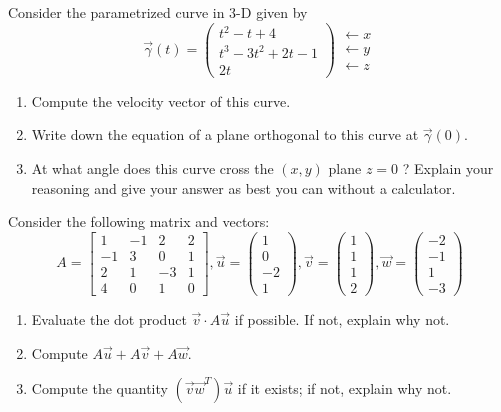 \documentclass[12pt]{amsart}
\begin{document}
\begin{problem}
Consider the parametrized curve in 3-D given by
$$
\vec{\gamma}(t)=\begin{pmatrix}
t^2-t+4 \\
t^3-3 t^2+2 t-1 \\
2 t
\end{pmatrix} \begin{gathered}
\leftarrow x \\
\leftarrow y \\
\leftarrow z
\end{gathered}
$$
\begin{enumerate}
    \item  Compute the velocity vector of this curve.
    \item Write down the equation of a plane orthogonal to this curve at $\vec{\gamma}(0)$.
    \item At what angle does this curve cross the $(x, y)$ plane $z=0$ ? Explain your reasoning and give your answer as best you can without a calculator.
\end{enumerate}
\end{problem}

\begin{problem}
Consider the following matrix and vectors:
$$
A=\left[\begin{array}{cccc}
1 & -1 & 2 & 2 \\
-1 & 3 & 0 & 1 \\
2 & 1 & -3 & 1 \\
4 & 0 & 1 & 0
\end{array}\right], 
\vec{u}=\left(\begin{array}{c}
1 \\
0 \\
-2 \\
1
\end{array}\right), 
\vec{v}=\left(\begin{array}{l}
1 \\
1 \\
1 \\
2
\end{array}\right), 
\vec{w}=\left(\begin{array}{c}
-2 \\
-1 \\
1 \\
-3
\end{array}\right)
$$
\begin{enumerate}
    \item Evaluate the dot product $\vec{v} \cdot A \vec{u}$ if possible. If not, explain why not.
    \item  Compute $A \vec{u} + A \vec{v}+A \vec{w}$.
    \item Compute the quantity $\left(\vec{v} \vec{w}^T\right) \vec{u}$ if it exists; if not, explain why not.
\end{enumerate}
\end{problem}
\end{document}
